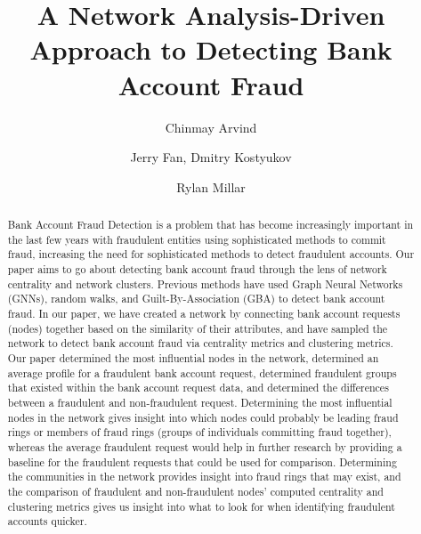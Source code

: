 \documentclass{styles/svproc}
\begin{document}
\mainmatter              %
%
\title{A Network Analysis-Driven Approach to Detecting Bank Account Fraud}
%
%
\author{Chinmay Arvind \and Jerry Fan,
Dmitry Kostyukov \and Rylan Millar}
%
%
%

\maketitle              %

\begin{abstract}
Bank Account Fraud Detection is a problem that has become increasingly important in the last few years with fraudulent entities using sophisticated methods to commit fraud, increasing the need for sophisticated methods to detect fraudulent accounts. Our paper aims to go about detecting bank account fraud through the lens of network centrality and network clusters. Previous methods have used Graph Neural Networks (GNNs), random walks, and Guilt-By-Association (GBA) to detect bank account fraud. In our paper, we have created a network by connecting bank account requests (nodes) together based on the similarity of their attributes, and have sampled the network to detect bank account fraud via centrality metrics and clustering metrics. Our paper determined the most influential nodes in the network, determined an average profile for a fraudulent bank account request, determined fraudulent groups that existed within the bank account request data, and determined the differences between a fraudulent and non-fraudulent request. Determining the most influential nodes in the network gives insight into which nodes could probably be leading fraud rings or members of fraud rings (groups of individuals committing fraud together), whereas the average fraudulent request would help in further research by providing a baseline for the fraudulent requests that could be used for comparison. Determining the communities in the network provides insight into fraud rings that may exist, and the comparison of fraudulent and non-fraudulent nodes' computed centrality and clustering metrics gives us insight into what to look for when identifying fraudulent accounts quicker.
\end{abstract}
\end{document}

